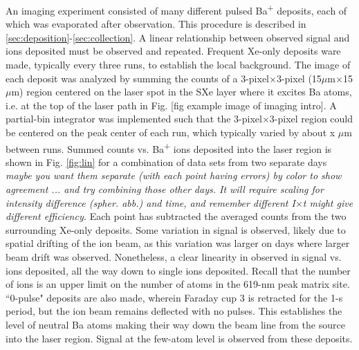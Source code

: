 An imaging experiment consisted of many different pulsed Ba\textsuperscript{+} deposits, each of which was evaporated after observation.  This procedure is described in \ref{sec:deposition}-\ref{sec:collection}.  A linear relationship between observed signal and ions deposited must be observed and repeated.  Frequent Xe-only deposits ware made, typically every three runs, to establish the local background.  The image of each deposit was analyzed by summing the counts of a 3-pixel$\times$3-pixel (15$\mu$m$\times$15$\mu$m) region centered on the laser spot in the SXe layer where it excites Ba atoms, i.e. at the top of the laser path in Fig. [fig example image of imaging intro].  A partial-bin integrator was implemented such that the 3-pixel$\times$3-pixel region could be centered on the peak center of each run, which typically varied by about {\color{red}x} $\mu$m between runs.  Summed counts vs. Ba\textsuperscript{+} ions deposited into the laser region is shown in Fig. \ref{fig:lin} for a combination of data sets from {\color{red}two} separate days \emph{\color{gray}maybe you want them separate (with each point having errors) by color to show agreement ... and try combining those other days.  It will require scaling for intensity difference (spher. abb.) and time, and remember different I$\times$t might give different efficiency.}  Each point has subtracted the averaged counts from the two surrounding Xe-only deposits.  Some variation in signal is observed, likely due to spatial drifting of the ion beam, as this variation was larger on days where larger beam drift was observed.  Nonetheless, a clear linearity in observed in signal vs. ions deposited, all the way down to single ions deposited.  Recall that the number of ions is an upper limit on the number of atoms in the 619-nm peak matrix site.  ``0-pulse" deposits are also made, wherein Faraday cup 3 is retracted for the 1-s period, but the ion beam remains deflected with no pulses.  This establishes the level of neutral Ba atoms making their way down the beam line from the source into the laser region.  Signal at the few-atom level is observed from these deposits.

